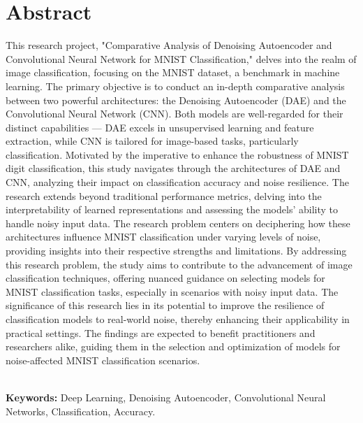 \chapter*{\center \Large  Abstract}

This research project, "Comparative Analysis of Denoising Autoencoder and Convolutional Neural Network for MNIST Classification," delves into the realm of image classification, focusing on the MNIST dataset, a benchmark in machine learning. The primary objective is to conduct an in-depth comparative analysis between two powerful architectures: the Denoising Autoencoder (DAE) and the Convolutional Neural Network (CNN). Both models are well-regarded for their distinct capabilities — DAE excels in unsupervised learning and feature extraction, while CNN is tailored for image-based tasks, particularly  classification. Motivated by the imperative to enhance the robustness of MNIST digit classification, this study navigates through the architectures of DAE and CNN, analyzing their impact on classification accuracy and noise resilience. The research extends beyond traditional performance metrics, delving into the interpretability of learned representations and assessing the models' ability to handle noisy input data. The research problem centers on deciphering how these architectures influence MNIST classification under varying levels of noise, providing insights into their respective strengths and limitations.  By addressing this research problem, the study aims to contribute to the advancement of image classification techniques, offering nuanced guidance on selecting models for MNIST classification tasks, especially in scenarios with noisy input data. The significance of this research lies in its potential to improve the resilience of classification models to real-world noise, thereby enhancing their applicability in practical settings. The findings are expected to benefit practitioners and researchers alike, guiding them in the selection and optimization of models for noise-affected MNIST classification scenarios.


~\\[1cm]
\noindent %
\textbf{Keywords:} Deep Learning, Denoising Autoencoder,
Convolutional Neural Networks, Classification, Accuracy.